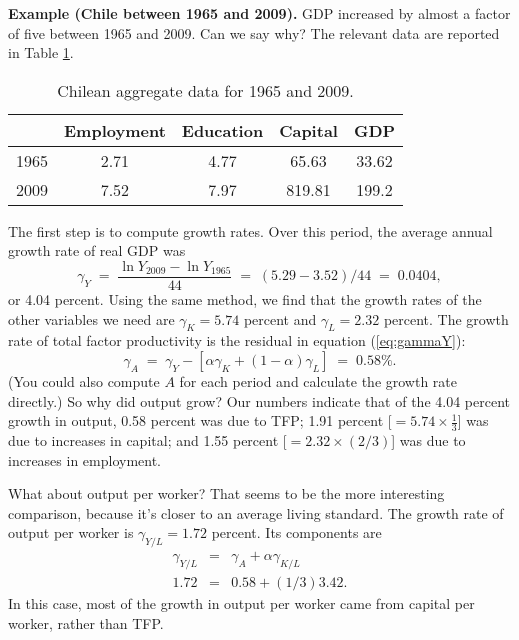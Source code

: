 \textbf{Example (Chile between 1965 and 2009).}
GDP increased by almost a factor of five between 1965 and 2009.
Can we say why? The relevant data are reported in Table \ref{tab:chile}.
\begin{table}[h]
\centering
\caption{Chilean aggregate data for 1965 and 2009.}
\begin{tabular}{lcccc}
\toprule
                &   Employment   & Education & Capital  & GDP \\%
\midrule
1965            &     2.71    &    4.77   & 65.63  &  33.62 \\%
2009            &     7.52    &    7.97   & 819.81 & 199.2 \\%
\bottomrule
\end{tabular}
\label{tab:chile}
\end{table}

The first step is to compute growth rates.
Over this period, the average annual growth rate of real GDP was
\[
    \gamma_{Y} \;=\; \frac{\ln Y_{2009} -\ln Y_{1965}}{44}
            \;=\; (5.29-3.52)/44 \;=\; 0.0404,
\]
or 4.04 percent.
Using the same method,
we find that the growth rates of the other variables we need are
 $\gamma_{K}=5.74$ percent and $\gamma_{L}=2.32$ percent.
The growth rate of total factor productivity is the residual
in equation (\ref{eq:gammaY}):
\[
    \gamma_A \;=\; \gamma_Y - \left[ \alpha \gamma_K +
            (1-\alpha) \gamma_L \right]
                \;=\; 0.58\% .
\]
(You could also compute $A$ for each period
and calculate the growth rate directly.)
So why did output grow?
Our numbers indicate that of the 4.04 percent growth in output,
0.58 percent was due to TFP; 1.91 percent [$=5.74\times\frac{1}{3}$] was due to increases in capital;
and 1.55 percent [$=2.32 \times (2/3)$] was due to increases in employment.

What about output per worker?
That seems to be the more interesting comparison,
because it's closer to an average living standard.
The growth rate of output per worker is
$ \gamma_{Y/L} = 1.72$ percent.
Its components are
\begin{eqnarray*}
    \gamma_{Y/L} &=& \gamma_A + \alpha \gamma_{K/L} \\
      1.72   &= & 0.58 + (1/3) 3.42.
\end{eqnarray*}
In this case, most of the growth in output per worker came from
capital per worker, rather than TFP.


